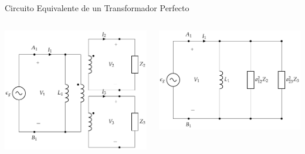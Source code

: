 \documentclass[xcolor={usenames,svgnames,dvipsnames}]{beamer}
\begin{document}
\begin{frame}[label={sec:org812aaea}]{Circuito Equivalente de un Transformador Perfecto}
\begin{columns}
\begin{column}{0.5\columnwidth}
\begin{center}
\includegraphics[width=\textwidth]{../figs/TrafoPerfectoIdealVariosDevanados_Impedancia.pdf}
\end{center}
\end{column}

\begin{column}{0.5\columnwidth}
\begin{center}
\includegraphics[width=\textwidth]{../figs/TrafoPerfectoVariosDevanados_Impedancia_Equivalente.pdf}
\end{center}
\end{column}
\end{columns}
\end{frame}
\end{document}

